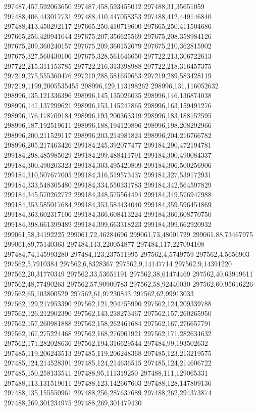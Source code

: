 297487,457,592063650
297487,458,593455012
297488,31,35651059
297488,406,443017731
297488,410,447058353
297488,412,449146840
297488,413,450292117
297665,250,410719600
297665,250,411504686
297665,256,420941044
297675,207,356625569
297675,208,358984126
297675,209,360240157
297675,209,360152679
297675,210,362815902
297675,327,560430106
297675,328,561646650
297722,213,306722613
297722,215,311153785
297722,216,313398988
297722,218,316457375
297219,275,555360476
297219,288,581659653
297219,289,583428119
297219,1199,2005535455
298996,129,113198262
298996,131,116052632
298996,135,121336396
298996,145,135026035
298996,146,136874038
298996,147,137299621
298996,153,145247865
298996,163,159491276
298996,176,178709184
298996,193,200363319
298996,183,188152595
298996,187,192519611
298996,188,194120896
298996,198,208292966
298996,200,211529117
298996,203,214981824
298996,204,216766782
298996,205,217463426
299184,245,392077477
299184,290,472194781
299184,298,485985029
299184,299,488411791
299184,300,490084337
299184,300,490203323
299184,303,495420809
299184,306,500256906
299184,310,507677005
299184,316,519573437
299184,327,539172931
299184,333,548305480
299184,334,550331783
299184,342,564597829
299184,345,570262772
299184,348,575564494
299184,349,576947988
299184,353,585017684
299184,353,584434040
299184,359,596454869
299184,363,602317106
299184,366,608413224
299184,366,608770750
299184,398,661399489
299184,399,663318223
299184,399,662920932
299061,58,34192225
299061,72,46284696
299061,73,48001729
299061,88,73467975
299061,89,75140363
297484,113,220054877
297484,117,227094108
297484,74,145993280
297484,123,237511995
297562,4,5749759
297562,4,5656903
297562,5,7910384
297562,6,8328367
297562,9,14147714
297562,9,14391220
297562,20,31770349
297562,33,53651191
297562,38,61474469
297562,40,63919611
297562,48,77490263
297562,57,90900783
297562,58,92440030
297562,60,95616226
297562,65,103800529
297562,61,97230843
297562,62,99913033
297562,129,217953390
297562,121,204755990
297562,124,209339788
297562,126,212902390
297562,143,238273467
297562,157,260265950
297562,157,260981888
297562,158,262461684
297562,167,276657791
297562,167,275224468
297562,168,276901921
297562,171,282634632
297562,171,282028636
297562,194,316629544
297484,99,193502632
297485,119,206243513
297485,119,206248368
297485,123,213219575
297485,124,214528391
297485,124,214636515
297485,124,214606722
297485,150,258133541
297488,95,111319250
297488,111,129065331
297488,113,131519011
297488,123,142667603
297488,128,147809136
297488,135,155550961
297488,256,287637689
297488,262,294373874
297488,269,301234975
297488,269,301479430
